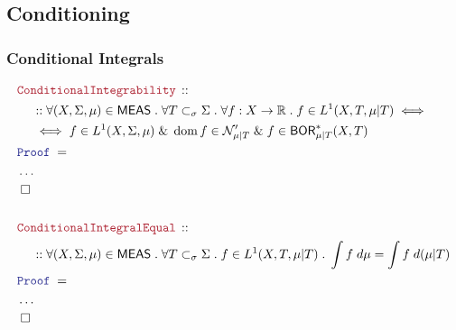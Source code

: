 \documentclass[12pt]{scrartcl}
\newcommand{\LOGIC}[1]{\textcolor{Blue}{\mathtt{#1}}}
\newcommand{\THM}[1]{\textcolor{Maroon}{\mathtt{#1}}}
\renewcommand{\.}{\; . \;}
\newcommand{\Theorem}[2]{& \THM{#1} \, :: \, #2 \\ & \Proof = \\ }
\newcommand{\NewLine}{\\ & \kern 1pc}
\newcommand{\Page}[1]{ \begin{align*} #1 \end{align*}   }
\newcommand{\NoProof}{ & \ldots \\ \EndProof}
\renewcommand{\And}{\; \& \;}
\newcommand{\Reals}{\mathbb{R} }
\newcommand{\QED}{\; \square}
\newcommand{\EndProof}{& \QED \\}
\newcommand{\Proof}{\LOGIC{Proof} \; }
\DeclareMathOperator*{\dom}{dom}
\newcommand{\BOR}{\mathsf{BOR}}
\newcommand{\Null}{\mathcal{N}}
\newcommand{\MEAS}{\mathsf{MEAS}}
\begin{document}
\subsection{Conditioning}
\subsubsection{Conditional Integrals}
\Page{
	\Theorem{ConditionalIntegrability}
	{
		\NewLine ::		
		\forall (X,\Sigma,\mu) \in \MEAS \. 
		\forall T \subset_\sigma \Sigma \.
		\forall f : X \to \Reals \.
		f \in L^1(X,T,\mu|T)
		\iff \NewLine \iff
		f \in L^1(X,\Sigma,\mu)
		\And \dom f \in \Null'_{\mu|T} 
		\And f \in \BOR_{\mu|T}^*(X,T)
	}
	\NoProof
	\\
	\Theorem{ConditionalIntegralEqual}
	{
		\NewLine ::		
		\forall (X,\Sigma,\mu) \in \MEAS \. 
		\forall T \subset_\sigma \Sigma \.
		f \in L^1(X,T,\mu|T)	 \.
		\int f \; d\mu = \int f \; d(\mu|T)
	}
	\NoProof
}
\newpage
\end{document}
